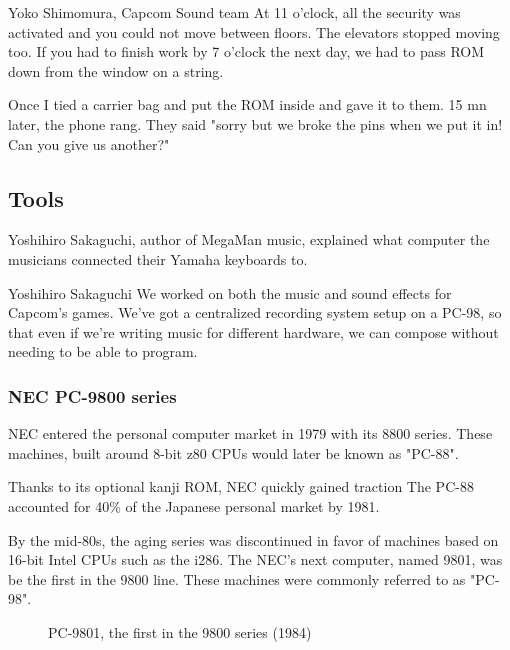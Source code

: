 \begin{q}{Yoko Shimomura, Capcom Sound team\cite{sf2musicsecurity}}
At 11 o'clock, all the security was activated and you could not move between floors. The elevators stopped moving too. If you had to finish work by 7 o'clock the next day, we had to pass ROM down from the window on a string.

Once I tied a carrier bag and put the ROM inside and gave it to them. 15 mn later, the phone rang. They said "sorry but we broke the pins when we put it in! Can you give us another?"
\end{q}



\subsection{Tools}
Yoshihiro Sakaguchi, author of MegaMan music, explained what computer the musicians connected their Yamaha keyboards to.

\begin{q}{Yoshihiro Sakaguchi\cite{yoko_shimomura_interview}  }
We worked on both the music and sound effects for Capcom’s games. We’ve got a centralized recording system setup on a PC-98, so that even if we’re writing music for different hardware, we can compose without needing to be able to program.
\end{q}

\subsubsection{NEC PC-9800 series}

NEC entered the personal computer market in 1979 with its 8800 series. These machines, built around 8-bit z80 CPUs would later be known as "PC-88". 

Thanks to its optional kanji ROM, NEC quickly gained traction The PC-88 accounted for 40\% of the Japanese personal market by 1981.

By the mid-80s, the aging series was discontinued in favor of machines based on 16-bit Intel CPUs such as the i286. The NEC's next computer, named 9801, was be the first in the 9800 line. These machines were commonly referred to as "PC-98".

\begin{figure}[H]

\caption*{PC-9801, the first in the 9800 series (1984)}
\end{figure}

